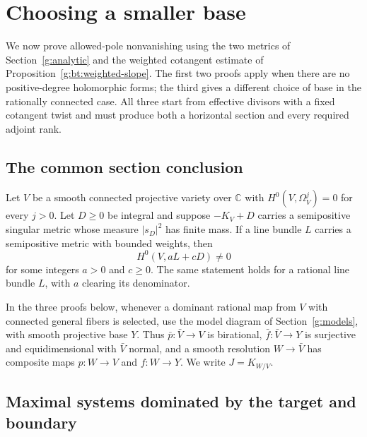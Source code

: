 \section{Choosing a smaller base}\label{g:reductions}
We now prove allowed-pole nonvanishing using the two metrics of
Section~\ref{g:analytic} and the weighted cotangent estimate of
Proposition~\ref{g:bt:weighted-slope}. The first two proofs apply when
there are no positive-degree holomorphic forms; the third gives a
different choice of base in the rationally connected case. All three
start from effective divisors with a fixed cotangent twist and must
produce both a horizontal section and every required adjoint rank.

\subsection{The common section conclusion}\label{rb:reductions}

\begin{theorem}\label{g:allowed}\label{rb:allowed}
Let $V$ be a smooth connected projective variety over $\mathbb C$ with
$H^0(V,\Omega_V^j)=0$ for every $j>0$.  Let $D\geq0$ be integral and
suppose $-K_V+D$ carries a semipositive singular metric whose measure
$|s_D|^2$ has finite mass.  If a line bundle $L$ carries a semipositive
metric with bounded weights, then
\[
                    H^0(V,aL+cD)\ne0
\]
for some integers $a>0$ and $c\geq0$.  The same statement holds for a
rational line bundle $L$, with $a$ clearing its denominator.
\end{theorem}

In the three proofs below, whenever a dominant rational map from $V$
with connected general fibers is selected, use the model diagram of
Section~\ref{g:models}, with smooth projective base $Y$.
Thus $\bar p:\bar V\to V$ is birational,
$\bar f:\bar V\to Y$ is surjective and equidimensional with $\bar V$
normal, and a smooth resolution $W\to\bar V$ has composite maps
$p:W\to V$ and $f:W\to Y$. We write $J=K_{W/V}$.

\subsection{Maximal systems dominated by the target and boundary}
\label{rb:dominated}


